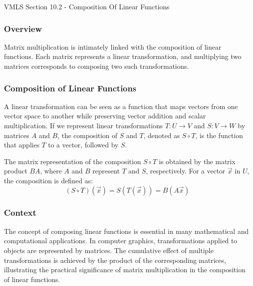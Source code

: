 \begin{notes}{VMLS Section 10.2 - Composition Of Linear Functions}
    \subsubsection*{Overview}

    Matrix multiplication is intimately linked with the composition of linear functions. Each matrix represents a linear transformation, and multiplying two matrices corresponds to composing two such 
    transformations. \vspace*{1em}

    \subsubsection*{Composition of Linear Functions}
    
    A linear transformation can be seen as a function that maps vectors from one vector space to another while preserving vector addition and scalar multiplication. If we represent linear transformations 
    $T: U \rightarrow V$ and $S: V \rightarrow W$ by matrices $A$ and $B$, the composition of $S$ and $T$, denoted as $S \circ T$, is the function that applies $T$ to a vector, followed by $S$. \vspace*{1em}

    \begin{highlight}
        The matrix representation of the composition $S \circ T$ is obtained by the matrix product $BA$, where $A$ and $B$ represent $T$ and $S$, respectively. For a vector $\vec{x}$ in $U$, the composition 
        is defined as:
        \begin{equation*}
            (S \circ T)(\vec{x}) = S(T(\vec{x})) = B(A\vec{x})
        \end{equation*}
    \end{highlight}
    
    \subsubsection*{Context}
    
    The concept of composing linear functions is essential in many mathematical and computational applications. In computer graphics, transformations applied to objects are represented by matrices. The 
    cumulative effect of multiple transformations is achieved by the product of the corresponding matrices, illustrating the practical significance of matrix multiplication in the composition of linear functions.
\end{notes}


